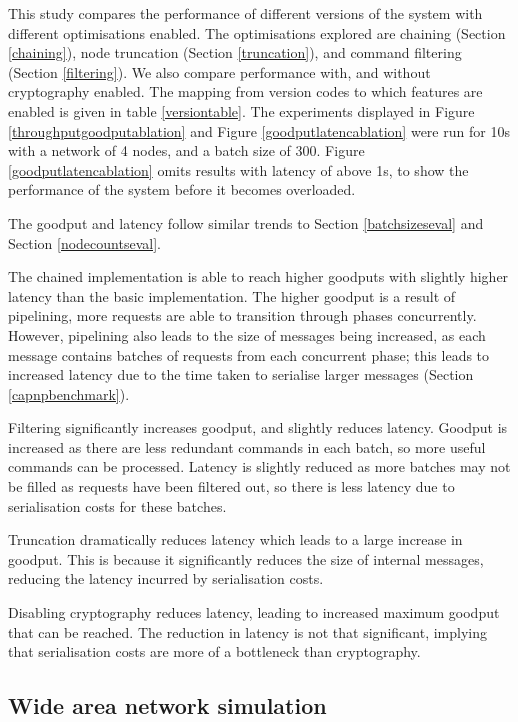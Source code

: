 This study compares the performance of different versions of the system with different optimisations enabled. The optimisations explored are chaining (Section \ref{chaining}), node truncation (Section \ref{truncation}), and command filtering (Section \ref{filtering}). We also compare performance with, and without cryptography enabled. The mapping from version codes to which features are enabled is given in table \ref{versiontable}. The experiments displayed in Figure \ref{throughputgoodputablation} and Figure \ref{goodputlatencablation} were run for 10s with a network of 4 nodes, and a batch size of 300. Figure \ref{goodputlatencablation} omits results with latency of above 1s, to show the performance of the system before it becomes overloaded.

The goodput and latency follow similar trends to Section \ref{batchsizeseval} and Section \ref{nodecountseval}.

The chained implementation is able to reach higher goodputs with slightly higher latency than the basic implementation. The higher goodput is a result of pipelining, more requests are able to transition through phases concurrently. However, pipelining also leads to the size of messages being increased, as each message contains batches of requests from each concurrent phase; this leads to increased latency due to the time taken to serialise larger messages (Section \ref{capnpbenchmark}).

Filtering significantly increases goodput, and slightly reduces latency. Goodput is increased as there are less redundant commands in each batch, so more useful commands can be processed. Latency is slightly reduced as more batches may not be filled as requests have been filtered out, so there is less latency due to serialisation costs for these batches.

Truncation dramatically reduces latency which leads to a large increase in goodput. This is because it significantly reduces the size of internal messages, reducing the latency incurred by serialisation costs.

Disabling cryptography reduces latency, leading to increased maximum goodput that can be reached. The reduction in latency is not that significant, implying that serialisation costs are more of a bottleneck than cryptography.

\subsection{Wide area network simulation} \label{minineteval}

